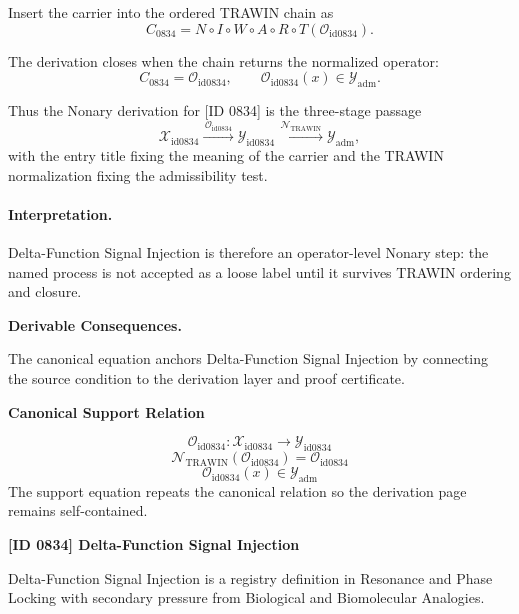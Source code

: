 Insert the carrier into the ordered TRAWIN chain as\[
C_{0834}=N\circ I\circ W\circ A\circ R\circ T(\mathcal{O}_{\mathrm{id0834}}).
\]

The derivation closes when the chain returns the normalized operator:\[
C_{0834}=\mathcal{O}_{\mathrm{id0834}},\qquad \mathcal{O}_{\mathrm{id0834}}(x)\in\mathcal{Y}_{\mathrm{adm}}.
\]

Thus the Nonary derivation for [ID 0834] is the three-stage passage
\[
\mathcal{X}_{\mathrm{id0834}}\xrightarrow{\,\mathcal{O}_{\mathrm{id0834}}\,} \mathcal{Y}_{\mathrm{id0834}}\xrightarrow{\,\mathcal{N}_{\mathrm{TRAWIN}}\,} \mathcal{Y}_{\mathrm{adm}},
\]
with the entry title fixing the meaning of the carrier and the TRAWIN normalization fixing the admissibility test.

\paragraph{Interpretation.} Delta-Function Signal Injection is therefore an operator-level Nonary step: the named process is not accepted as a loose label until it survives TRAWIN ordering and closure.

\par\vspace{0.35em}
\noindent\textbf{Derivable Consequences.}\quad
\begingroup
\footnotesize
\raggedright
The canonical equation anchors Delta-Function Signal Injection by connecting the source condition to the derivation layer and proof certificate.
\par\endgroup

\noindent\textbf{Canonical Support Relation}\par
\[
\mathcal{O}_{\mathrm{id0834}}:\mathcal{X}_{\mathrm{id0834}}\longrightarrow\mathcal{Y}_{\mathrm{id0834}}
\]
\[
\mathcal{N}_{\mathrm{TRAWIN}}(\mathcal{O}_{\mathrm{id0834}})=\mathcal{O}_{\mathrm{id0834}}
\]
\[
\mathcal{O}_{\mathrm{id0834}}(x)\in\mathcal{Y}_{\mathrm{adm}}
\]
\noindent The support equation repeats the canonical relation so the derivation page remains self-contained.\par

\clearpage
\noindent\textbf{[ID 0834] Delta-Function Signal Injection}\par
\vspace{0.35em}
\begingroup\small
{}
Delta-Function Signal Injection is a registry definition in Resonance and Phase Locking with secondary pressure from Biological and Biomolecular Analogies.

